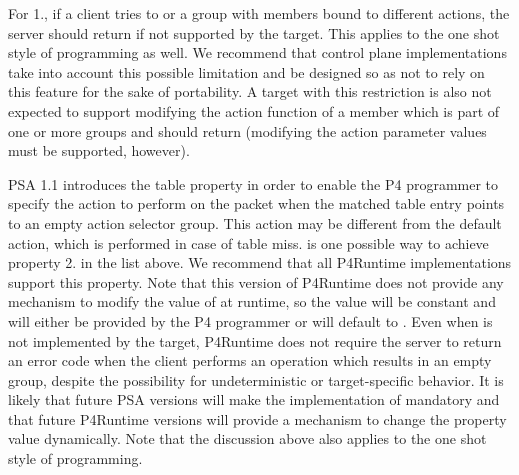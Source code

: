 \documentclass[11pt]{article}
\begin{document}
{%
\noindent{}For 1., if a client tries to  or  a group with members bound to
different actions, the server should return  if not supported by
the target. This applies to the one shot style of programming as well. We
recommend that control plane implementations take into account this possible
limitation and be designed so as not to rely on this feature for the sake of
portability. A target with this restriction is also not expected to support
modifying the action function of a member which is part of one or more groups
and should return  (modifying the action parameter values must be
supported, however).%

PSA 1.1 introduces the  table property in order to
enable the P4 programmer to specify the action to perform on the packet when the
matched table entry points to an empty action selector group. This action may be
different from the default action, which is performed in case of table
miss.  is one possible way to achieve property 2. in the
list above. We recommend that all P4Runtime implementations support this
property. Note that this version of P4Runtime does not provide any mechanism to
modify the value of  at runtime, so the value will be
constant and will either be provided by the P4 programmer or will default to
. Even when  is not implemented by the target,
P4Runtime does not require the server to return an error code when the client
performs an operation which results in an empty group, despite the possibility
for undeterministic or target-specific behavior. It is likely that future PSA
versions will make the implementation of  mandatory and
that future P4Runtime versions will provide a mechanism to change the property
value dynamically. Note that the discussion above also applies to the one shot
style of programming.%

}
\end{document}
